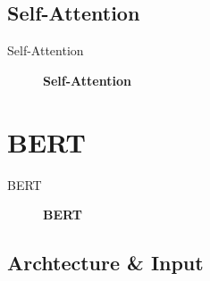 \documentclass[10pt]{beamer}
\begin{document}
  \subsection{Self-Attention}

  \begin{frame}{Self-Attention}
    \begin{figure}
      \centering
      \caption{\textbf{Self-Attention} }
      \label{fig:Self-Attention}
    \end{figure}
  \end{frame}

\section{BERT}

  \begin{frame}{BERT}
    \begin{figure}
      \centering
      \caption{\textbf{BERT} }
      \label{fig:BERT}
    \end{figure}
  \end{frame}

  \subsection{Archtecture \& Input}
  
\end{document}
